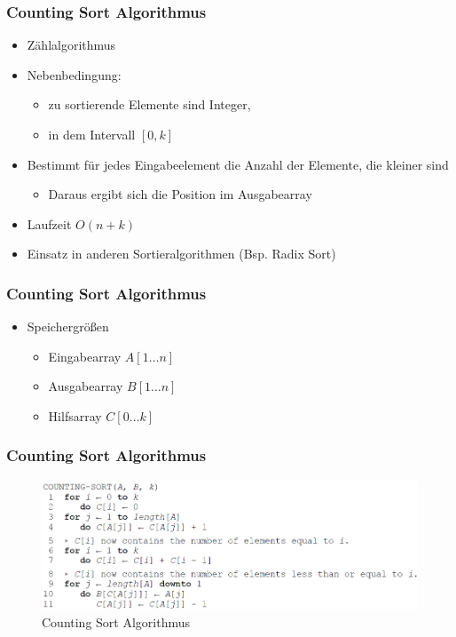 \documentclass{beamer}
\begin{document}
\begin{frame}
  \frametitle{Counting Sort Algorithmus}
  \begin{itemize}
    \item Zählalgorithmus
    \item Nebenbedingung:
    \begin{itemize}
      \item zu sortierende Elemente sind Integer,
      \item in dem Intervall $[0,k]$
    \end{itemize}
    \item Bestimmt für jedes Eingabeelement die Anzahl der Elemente, die kleiner sind
    \begin{itemize}
      \item Daraus ergibt sich die Position im Ausgabearray
    \end{itemize}
    \item Laufzeit $O(n+k)$
    \item Einsatz in anderen Sortieralgorithmen (Bsp. Radix Sort)
  \end{itemize}
\end{frame}

\begin{frame}
  \frametitle{Counting Sort Algorithmus}
  \begin{itemize}
    \item Speichergrößen
    \begin{itemize}
        \item Eingabearray $A[1\dots n]$
        \item Ausgabearray $B[1\dots n]$
        \item Hilfsarray $C[0\dots k]$
    \end{itemize}
  \end{itemize}
\end{frame}

\begin{frame}
  \frametitle{Counting Sort Algorithmus}
  \begin{figure}[htb]
    \centering
    \includegraphics[width=1.1\textwidth]{img/counting-sort}
    \caption{Counting Sort Algorithmus \cite{CormenLeisersonRivestStein200107}} %
  \end{figure}
\end{frame}
\end{document}
